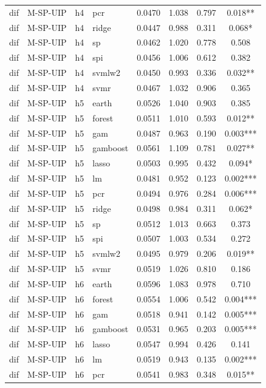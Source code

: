 \begin{ThreePartTable}
\begin{longtable}[t]{llclcccc}
dif & M-SP-UIP & h4 & pcr & 0.0470 & 1.038 & 0.797 & 0.018**\\
dif & M-SP-UIP & h4 & ridge & 0.0447 & 0.988 & 0.311 & 0.068*\\
dif & M-SP-UIP & h4 & sp & 0.0462 & 1.020 & 0.778 & 0.508\\
dif & M-SP-UIP & h4 & spi & 0.0456 & 1.006 & 0.612 & 0.382\\
dif & M-SP-UIP & h4 & svmlw2 & 0.0450 & 0.993 & 0.336 & 0.032**\\
dif & M-SP-UIP & h4 & svmr & 0.0467 & 1.032 & 0.906 & 0.365\\
\addlinespace
dif & M-SP-UIP & h5 & earth & 0.0526 & 1.040 & 0.903 & 0.385\\
dif & M-SP-UIP & h5 & forest & 0.0511 & 1.010 & 0.593 & 0.012**\\
dif & M-SP-UIP & h5 & gam & 0.0487 & 0.963 & 0.190 & 0.003***\\
dif & M-SP-UIP & h5 & gamboost & 0.0561 & 1.109 & 0.781 & 0.027**\\
dif & M-SP-UIP & h5 & lasso & 0.0503 & 0.995 & 0.432 & 0.094*\\
dif & M-SP-UIP & h5 & lm & 0.0481 & 0.952 & 0.123 & 0.002***\\
dif & M-SP-UIP & h5 & pcr & 0.0494 & 0.976 & 0.284 & 0.006***\\
dif & M-SP-UIP & h5 & ridge & 0.0498 & 0.984 & 0.311 & 0.062*\\
dif & M-SP-UIP & h5 & sp & 0.0512 & 1.013 & 0.663 & 0.373\\
dif & M-SP-UIP & h5 & spi & 0.0507 & 1.003 & 0.534 & 0.272\\
dif & M-SP-UIP & h5 & svmlw2 & 0.0495 & 0.979 & 0.206 & 0.019**\\
dif & M-SP-UIP & h5 & svmr & 0.0519 & 1.026 & 0.810 & 0.186\\
\addlinespace
dif & M-SP-UIP & h6 & earth & 0.0596 & 1.083 & 0.978 & 0.710\\
dif & M-SP-UIP & h6 & forest & 0.0554 & 1.006 & 0.542 & 0.004***\\
dif & M-SP-UIP & h6 & gam & 0.0518 & 0.941 & 0.142 & 0.005***\\
dif & M-SP-UIP & h6 & gamboost & 0.0531 & 0.965 & 0.203 & 0.005***\\
dif & M-SP-UIP & h6 & lasso & 0.0547 & 0.994 & 0.426 & 0.141\\
dif & M-SP-UIP & h6 & lm & 0.0519 & 0.943 & 0.135 & 0.002***\\
dif & M-SP-UIP & h6 & pcr & 0.0541 & 0.983 & 0.348 & 0.015**\\

\end{longtable}
\end{ThreePartTable}
